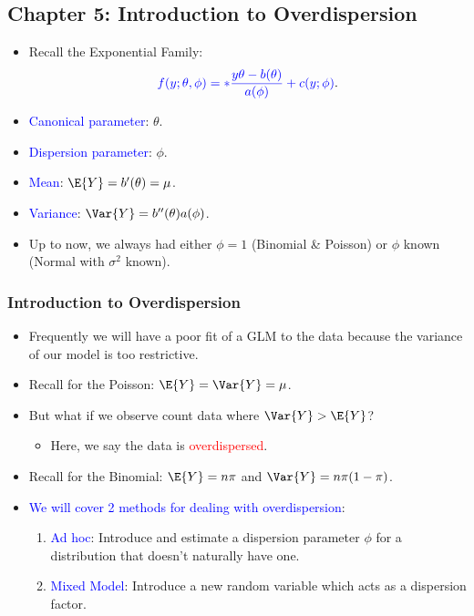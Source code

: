 \documentclass[oneside]{book}\usepackage[]{graphicx}\usepackage[svgnames]{xcolor}
\let\exp\relax%
\begin{document}
\subsection*{Chapter 5: Introduction to Overdispersion}
\begin{itemize}
      \item Recall the Exponential Family:
            \[ \textcolor{Blue}{ f(y;\theta,\phi)=\exp*{\frac{y\theta-b(\theta)}{a(\phi)}+c(y;\phi)} }. \]
      \item \textcolor{Blue}{Canonical parameter}: $ \theta $.
      \item \textcolor{Blue}{Dispersion parameter}: $ \phi $.
      \item \textcolor{Blue}{Mean}: $ \E{Y}=b^\prime(\theta)=\mu $.
      \item \textcolor{Blue}{Variance}: $ \Var{Y}=b^{\prime\prime}(\theta)a(\phi) $.
      \item Up to now, we always had either $ \phi=1 $ (Binomial \& Poisson) or $ \phi $ known (Normal with $ \sigma^2 $ known).
\end{itemize}
\subsubsection*{Introduction to Overdispersion}
\begin{itemize}
      \item Frequently we will have a poor fit of a GLM to the data because the variance of
            our model is too restrictive.
      \item Recall for the Poisson: $ \E{Y}=\Var{Y}=\mu $.
      \item But what if we observe count data where $ \Var{Y}>\E{Y} $?
            \begin{itemize}
                  \item Here, we say the data is \textcolor{Red}{overdispersed}.
            \end{itemize}
      \item Recall for the Binomial: $ \E{Y}=n\pi $ and $ \Var{Y}=n\pi(1-\pi) $.
      \item \textcolor{Blue}{We will cover 2 methods for dealing with overdispersion}:
            \begin{enumerate}[1.]
                  \item \textcolor{Blue}{Ad hoc}: Introduce and estimate a dispersion parameter $ \phi $ for a distribution that
                        doesn't naturally have one.
                  \item \textcolor{Blue}{Mixed Model}: Introduce a new random variable which acts as a dispersion factor.
            \end{enumerate}
\end{itemize}
\end{document}
